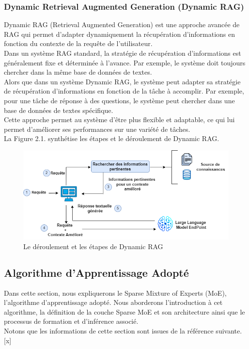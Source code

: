 \subsubsection{Dynamic Retrieval Augmented Generation (Dynamic RAG)}
\justifying
Dynamic RAG (Retrieval Augmented Generation) est une approche avancée de RAG qui permet d'adapter dynamiquement la récupération d'informations en fonction du contexte de la requête de l'utilisateur.\\
Dans un système RAG standard, la stratégie de récupération d'informations est généralement fixe et déterminée à l'avance. Par exemple, le système doit toujours chercher dans la même base de données de textes.\\
Alors que dans un système Dynamic RAG, le système peut adapter sa stratégie de récupération d'informations en fonction de la tâche à accomplir. Par exemple, pour une tâche de réponse à des questions, le système peut chercher dans une base de données de textes spécifique.\\
Cette approche permet au système d'être plus flexible et adaptable, ce qui lui permet d’améliorer ses performances sur une variété de tâches.\\
La Figure 2.1. synthétise les étapes et le déroulement  de Dynamic RAG.

\begin{figure}[H]
    \centering
    \includegraphics[width=\textwidth]{images/chp2/fig1.png}
   \caption{Le déroulement et les étapes de Dynamic RAG}
    \label{fig:deroulement dynamic rag}      
\end{figure}


\subsection{Algorithme d’Apprentissage Adopté}
\justifying
Dans cette section, nous expliquerons le Sparse Mixture of Experts (MoE), l’algorithme d’apprentissage adopté. Nous aborderons l'introduction à cet algorithme, la définition de la couche Sparse MoE et son architecture ainsi que le processus de formation et d'inférence associé.\\
Notons que les informations de cette section sont issues de la référence suivante.[x]

